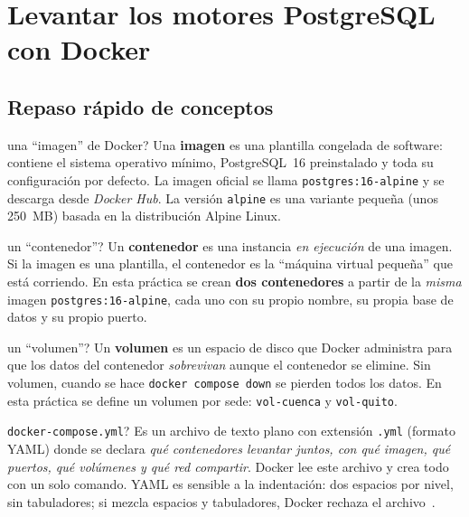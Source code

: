 \documentclass[11pt,a4paper]{article}
\begin{document}
\clearpage
\section{Levantar los motores PostgreSQL con Docker}

\subsection{Repaso r\'apido de conceptos}

\begin{conceptobox}{una ``imagen'' de Docker?}
Una \textbf{imagen} es una plantilla congelada de software: contiene el sistema operativo m\'inimo, PostgreSQL~16 preinstalado y toda su configuraci\'on por defecto. La imagen oficial se llama \texttt{postgres:16-alpine} y se descarga desde \emph{Docker Hub}. La versi\'on \texttt{alpine} es una variante peque\~na (unos 250~MB) basada en la distribuci\'on Alpine Linux.
\end{conceptobox}

\begin{conceptobox}{un ``contenedor''?}
Un \textbf{contenedor} es una instancia \emph{en ejecuci\'on} de una imagen. Si la imagen es una plantilla, el contenedor es la ``m\'aquina virtual peque\~na'' que est\'a corriendo. En esta pr\'actica se crean \textbf{dos contenedores} a partir de la \emph{misma} imagen \texttt{postgres:16-alpine}, cada uno con su propio nombre, su propia base de datos y su propio puerto.
\end{conceptobox}

\begin{conceptobox}{un ``volumen''?}
Un \textbf{volumen} es un espacio de disco que Docker administra para que los datos del contenedor \emph{sobrevivan} aunque el contenedor se elimine. Sin volumen, cuando se hace \texttt{docker compose down} se pierden todos los datos. En esta pr\'actica se define un volumen por sede: \texttt{vol-cuenca} y \texttt{vol-quito}.
\end{conceptobox}

\begin{conceptobox}{\texttt{docker-compose.yml}?}
Es un archivo de texto plano con extensi\'on \texttt{.yml} (formato YAML) donde se declara \emph{qu\'e contenedores levantar juntos, con qu\'e imagen, qu\'e puertos, qu\'e vol\'umenes y qu\'e red compartir}. Docker lee este archivo y crea todo con un solo comando. YAML es sensible a la indentaci\'on: dos espacios por nivel, sin tabuladores; si mezcla espacios y tabuladores, Docker rechaza el archivo~\cite{DockerCompose2024}.
\end{conceptobox}
\end{document}

